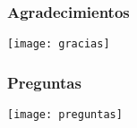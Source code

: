 \documentclass[xcolor=dvipsnames]{beamer}
\begin{document}
	\begin{frame}
		\transdissolve
		\frametitle{Agradecimientos}
		\begin{center}
			\texttt{[image: gracias]}
		\end{center}
	\end{frame}
	
	\begin{frame}
		\transdissolve
		\frametitle{Preguntas}
		\begin{center}
			\hspace{2cm}
			\texttt{[image: preguntas]}
		\end{center}
	\end{frame}
\end{document}
